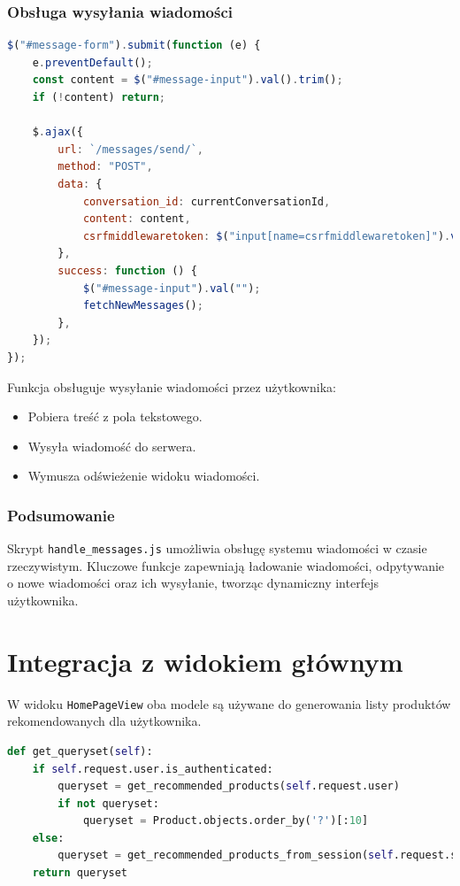 \documentclass[12pt,a4paper,oneside]{article}
\theoremstyle{definition}
\numberwithin{equation}{section}
\begin{document}
\subsubsection*{Obsługa wysyłania wiadomości}
\begin{lstlisting}[language=JavaScript, caption=Wysyłanie wiadomości]
$("#message-form").submit(function (e) {
    e.preventDefault();
    const content = $("#message-input").val().trim();
    if (!content) return;

    $.ajax({
        url: `/messages/send/`,
        method: "POST",
        data: {
            conversation_id: currentConversationId,
            content: content,
            csrfmiddlewaretoken: $("input[name=csrfmiddlewaretoken]").val(),
        },
        success: function () {
            $("#message-input").val("");
            fetchNewMessages();
        },
    });
});
\end{lstlisting}
Funkcja obsługuje wysyłanie wiadomości przez użytkownika:
\begin{itemize}
    \item Pobiera treść z pola tekstowego.
    \item Wysyła wiadomość do serwera.
    \item Wymusza odświeżenie widoku wiadomości.
\end{itemize}



\subsubsection{Podsumowanie}
Skrypt \texttt{handle\_messages.js} umożliwia obsługę systemu wiadomości w 
czasie rzeczywistym. Kluczowe funkcje zapewniają ładowanie wiadomości, odpytywanie o nowe wiadomości oraz ich wysyłanie, tworząc dynamiczny interfejs użytkownika.



\section{Integracja z widokiem głównym}
W widoku \texttt{HomePageView} oba modele są używane do generowania listy produktów rekomendowanych dla użytkownika.

\begin{lstlisting}[language=Python]
def get_queryset(self):
    if self.request.user.is_authenticated:
        queryset = get_recommended_products(self.request.user)
        if not queryset:
            queryset = Product.objects.order_by('?')[:10]
    else:
        queryset = get_recommended_products_from_session(self.request.session)
    return queryset
\end{lstlisting}
\end{document}
